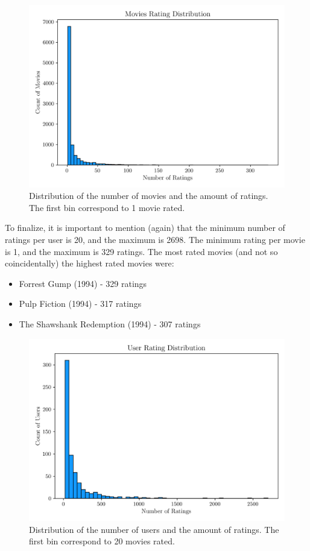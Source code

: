 \documentclass[conference]{IEEEtran}
\begin{document}
\begin{figure}[H]
    \centering
    \includegraphics[width=1\linewidth]{assets/distribution_moviesratings.png}
    \caption{Distribution of the number of movies and the amount of ratings. The first bin correspond to 1 movie rated.}    \label{fig:distribution_moviesratings}
\end{figure}

To finalize, it is important to mention (again) that the minimum number of ratings per user is 20, and the maximum is 2698. The minimum rating per movie is 1, and the maximum is 329 ratings. The most rated movies (and not so coincidentally) the highest rated movies were:
\begin{itemize}
    \item Forrest Gump (1994) - 329 ratings
    \item Pulp Fiction (1994) - 317 ratings
    \item The Shawshank Redemption (1994) - 307 ratings
\end{itemize}


\begin{figure}[H]
    \centering
    \includegraphics[width=1\linewidth]{assets/distribution_userratings.png}
    \caption{Distribution of the number of users and the amount of ratings. The first bin correspond to 20 movies rated.}    \label{fig:distribution_userratings}
\end{figure}
\end{document}
